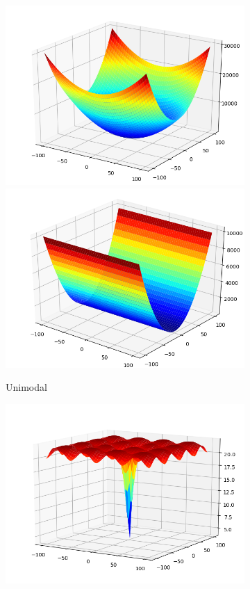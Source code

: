 \documentclass[a4paper,13pt,2p]{report}
\begin{document}
\begin{figure}[!ht] 
   \centering
   \begin{subfigure}{0.24\textwidth}
   	\includegraphics[width=1\linewidth]{png/functions/uni_f5}
  	 \includegraphics[width=1\linewidth]{png/functions/uni_f7}
  	\caption{Unimodal}
  	\label{subfig:uni}
  	\end{subfigure}
    \begin{subfigure}{0.24\textwidth}
   	\includegraphics[width=1\linewidth]{png/functions/multi_f9}

\end{subfigure}
\end{figure}
\end{document}
